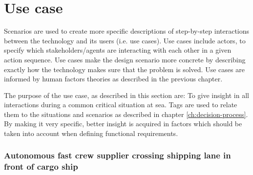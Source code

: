 \section{Use case}
\label{sec:use-case}
Scenarios are used to create more specific descriptions of step-by-step interactions between the technology and its users (i.e. use cases). Use cases include actors, to specify which stakeholders/agents are interacting with each other in a given action sequence.
Use cases make the design scenario more concrete by describing exactly how the technology makes sure that the problem is solved. Use cases are informed by human factors theories as described in the previous chapter.


The purpose of the use case, as described in this section are: To give insight in all interactions during a common critical situation at sea. Tags are used to relate them to the situations and scenarios as described in chapter \ref{ch:decision-process}. By making it very specific, better insight is acquired in factors which should be taken into account when defining functional requirements. 

\subsubsection{Autonomous fast crew supplier crossing shipping lane in front of cargo ship}

